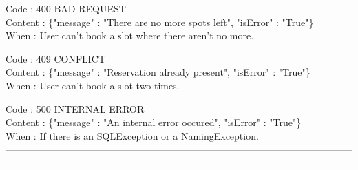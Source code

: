 \begin{itemize}
	Code : 400 BAD REQUEST\\
	Content : \{"message" : "There are no more spots left", "isError" : "True"\}\\
	When : User can't book a slot where there aren't no more.
	
	Code : 409 CONFLICT\\
	Content : \{"message" : "Reservation already present", "isError" : "True"\}\\
	When : User can't book a slot two times.
	
	Code : 500 INTERNAL ERROR\\
	Content : \{"message" : "An internal error occured", "isError" : "True"\}\\
	When : If there is an SQLException or a NamingException.\\
	------------------------------------------------------------------------------------------------------------------------------------
\end{itemize}

